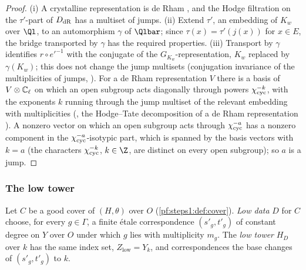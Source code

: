\begin{proof}
(i) A crystalline representation is de Rham \cite[Exp.~III]{Fontaine1994rss}, and the Hodge filtration on the
$\tau'$-part of $D_{\mathrm{dR}}$ has a multiset of jumps. (ii) Extend $\tau'$, an embedding of $K_w$ over $\Ql$, to an
automorphism $\gamma$ of $\Qlbar$; since $\tau(x)=\tau'(j(x))$ for $x\in E$, the bridge transported by $\gamma$ has the
required properties. (iii) Transport by $\gamma$ identifies $r\circ e'^{-1}$ with the conjugate of the
$G_{K_w}$-representation, $K_w$ replaced by $\gamma(K_w)$; this does not change the jump multisets (conjugation invariance
of the multiplicities of jumps, ). For a de Rham representation $V$ there is a basis of
$V\otimes\mathbb{C}_\ell$ on which an open subgroup acts diagonally through powers $\chi_{\mathrm{cyc}}^{-k}$, with the exponents $k$
running through the jump multiset of the relevant embedding with multiplicities
(, the Hodge--Tate decomposition of a de Rham
representation \cite{Fontaine1994}). A nonzero vector on which an open subgroup acts through $\chi_{\mathrm{cyc}}^{-a}$ has a
nonzero component in the $\chi_{\mathrm{cyc}}^{-a}$-isotypic part, which is spanned by the basis vectors with $k=a$ (the
characters $\chi_{\mathrm{cyc}}^{-k}$, $k\in\Z$, are distinct on every open subgroup); so $a$ is a jump.
\end{proof}

\subsubsection{The low tower}

\begin{definition}\label{pf:steps1:def:low}
Let $C$ be a good cover of $(H,\theta)$ over $O$ (\cref{pf:steps1:def:cover}). \emph{Low data} $D$ for $C$ choose,
for every $g\in\Gamma$, a finite \'etale correspondence $(s'_g,t'_g)$ of constant degree on $Y$ over $O$ under which
$g$ lies with multiplicity $m_g$. The \emph{low tower} $H_D$ over $k$ has the same index set, $Z_{\mathrm{low}}=Y_k$,
and correspondences the base changes of $(s'_g,t'_g)$ to $k$.
\end{definition}

